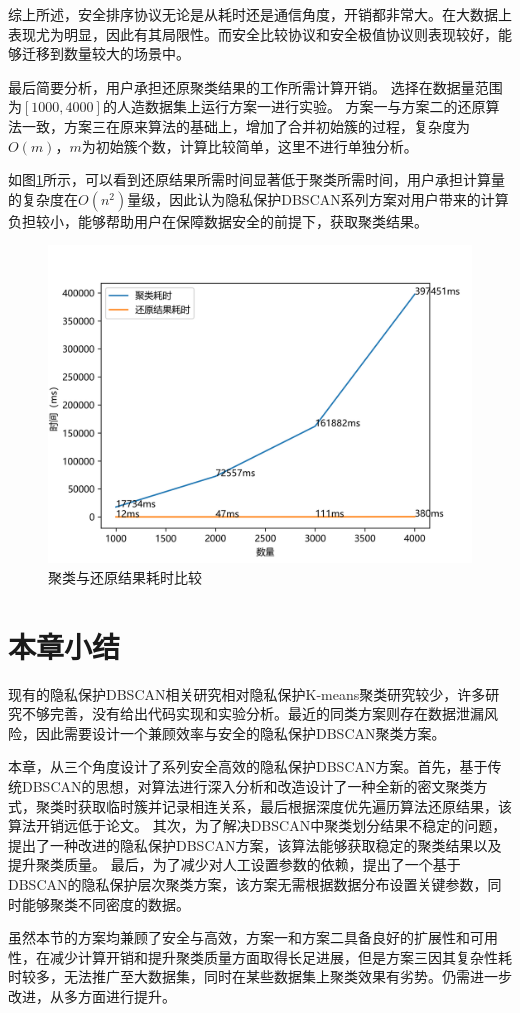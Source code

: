 综上所述，安全排序协议无论是从耗时还是通信角度，开销都非常大。在大数据上表现尤为明显，因此有其局限性。而安全比较协议和安全极值协议则表现较好，能够迁移到数量较大的场景中。

最后简要分析，用户承担还原聚类结果的工作所需计算开销。
选择在数据量范围为$ [1000,4000] $的人造数据集上运行方案一进行实验。
方案一与方案二的还原算法一致，方案三在原来算法的基础上，增加了合并初始簇的过程，复杂度为$ O(m) $，$ m $为初始簇个数，计算比较简单，这里不进行单独分析。

如图\ref{s4-exp-recover}所示，可以看到还原结果所需时间显著低于聚类所需时间，用户承担计算量的复杂度在$ O(n^2) $量级，因此认为隐私保护DBSCAN系列方案对用户带来的计算负担较小，能够帮助用户在保障数据安全的前提下，获取聚类结果。
\begin{figure}[htbp]
	\centering
	\includegraphics[width=0.6\linewidth]{img/testrc.png}
	\caption{聚类与还原结果耗时比较}
	\label{s4-exp-recover}
\end{figure}

\newpage
\section{本章小结}
\label{s4-xiaojie}
现有的隐私保护DBSCAN相关研究相对隐私保护K-means聚类研究较少，许多研究不够完善，没有给出代码实现和实验分析。最近的同类方案\cite{bozdemir2021privacy}则存在数据泄漏风险，因此需要设计一个兼顾效率与安全的隐私保护DBSCAN聚类方案。

本章，从三个角度设计了系列安全高效的隐私保护DBSCAN方案。首先，基于传统DBSCAN的思想，对算法进行深入分析和改造设计了一种全新的密文聚类方式，聚类时获取临时簇并记录相连关系，最后根据深度优先遍历算法还原结果，该算法开销远低于论文\cite{bozdemir2021privacy}。
其次，为了解决DBSCAN中聚类划分结果不稳定的问题，提出了一种改进的隐私保护DBSCAN方案，该算法能够获取稳定的聚类结果以及提升聚类质量。
最后，为了减少对人工设置参数的依赖，提出了一个基于DBSCAN的隐私保护层次聚类方案，该方案无需根据数据分布设置关键参数，同时能够聚类不同密度的数据。

虽然本节的方案均兼顾了安全与高效，方案一和方案二具备良好的扩展性和可用性，在减少计算开销和提升聚类质量方面取得长足进展，但是方案三因其复杂性耗时较多，无法推广至大数据集，同时在某些数据集上聚类效果有劣势。仍需进一步改进，从多方面进行提升。
